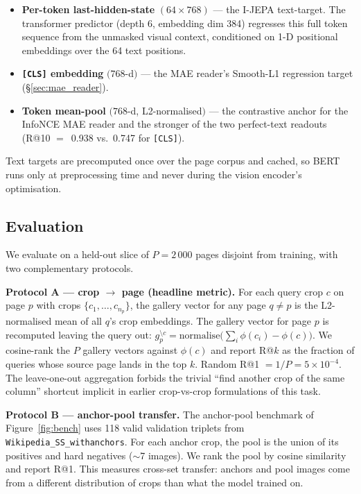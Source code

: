\documentclass{article}
\begin{document}
\begin{itemize}
\item \textbf{Per-token last-hidden-state} $(64\times768)$ --- the
I-JEPA text-target. The transformer predictor (depth 6, embedding
dim 384) regresses this full token sequence from the unmasked
visual context, conditioned on 1-D positional embeddings over the
64 text positions.
\item \textbf{\texttt{[CLS]} embedding} $(768$-d$)$ --- the MAE
reader's Smooth-L1 regression target (\S\ref{sec:mae_reader}).
\item \textbf{Token mean-pool} $(768$-d, L2-normalised$)$ --- the
contrastive anchor for the InfoNCE MAE reader and the stronger of
the two perfect-text readouts (R@10 $=$~0.938 vs.\ 0.747 for
\texttt{[CLS]}).
\end{itemize}

\noindent Text targets are precomputed once over the page corpus
and cached, so BERT runs only at preprocessing time and never
during the vision encoder's optimisation.

\subsection{Evaluation}
\label{sec:eval}

We evaluate on a held-out slice of $P=2\,000$ pages disjoint from
training, with two complementary protocols.

\textbf{Protocol A --- crop $\rightarrow$ page (headline metric).}
For each query crop $c$ on page $p$ with crops
$\{c_1,\dots,c_{n_p}\}$, the gallery vector for any page $q\neq p$
is the L2-normalised mean of all $q$'s crop embeddings. The
gallery vector for page $p$ is recomputed leaving the query out:
\(g_p^{\setminus c} = \mathrm{normalise}\!\bigl(\sum_i \phi(c_i) - \phi(c)\bigr)\).
We cosine-rank the $P$ gallery vectors against $\phi(c)$ and
report R@$k$ as the fraction of queries whose source page lands
in the top $k$. Random R@1 $=1/P=5\times 10^{-4}$. The
leave-one-out aggregation forbids the trivial
``find another crop of the same column'' shortcut implicit in
earlier crop-vs-crop formulations of this task.

\textbf{Protocol B --- anchor-pool transfer.} The anchor-pool
benchmark of Figure~\ref{fig:bench} uses 118 valid validation
triplets from \texttt{Wikipedia\_SS\_withanchors}. For each anchor
crop, the pool is the union of its positives and hard negatives
($\sim$7 images). We rank the pool by cosine similarity and
report R@1. This measures cross-set transfer: anchors and pool
images come from a different distribution of crops than what the
model trained on.
\end{document}
